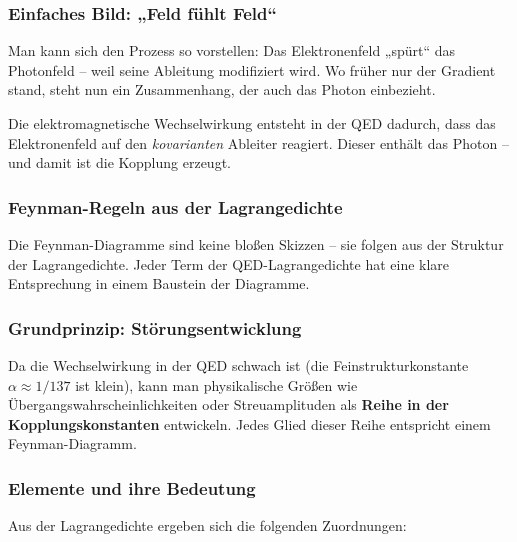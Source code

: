 \subsubsection*{Einfaches Bild: „Feld fühlt Feld“}
Man kann sich den Prozess so vorstellen: Das Elektronenfeld „spürt“ das Photonfeld – weil seine Ableitung modifiziert wird. Wo früher nur der Gradient stand, steht nun ein Zusammenhang, der auch das Photon einbezieht.

\medskip
\begin{tcolorbox}[didaktikbox, title=Die Kraft entsteht aus dem Ableiter]
	\label{box:Die Kraft entsteht aus dem Ableiter}
	Die elektromagnetische Wechselwirkung entsteht in der QED dadurch, dass das Elektronenfeld auf den \emph{kovarianten} Ableiter reagiert. Dieser enthält das Photon – und damit ist die Kopplung erzeugt.
\end{tcolorbox}

\subsubsection{Feynman-Regeln aus der Lagrangedichte}

Die Feynman-Diagramme sind keine bloßen Skizzen – sie folgen aus der Struktur der Lagrangedichte. Jeder Term der QED-Lagrangedichte hat eine klare Entsprechung in einem Baustein der Diagramme.

\subsubsection*{Grundprinzip: Störungsentwicklung}
Da die Wechselwirkung in der QED schwach ist (die Feinstrukturkonstante $\alpha \approx 1/137$ ist klein), kann man physikalische Größen wie Übergangswahrscheinlichkeiten oder Streuamplituden als \textbf{Reihe in der Kopplungskonstanten} entwickeln. Jedes Glied dieser Reihe entspricht einem Feynman-Diagramm.

\subsubsection*{Elemente und ihre Bedeutung}
Aus der Lagrangedichte ergeben sich die folgenden Zuordnungen:


